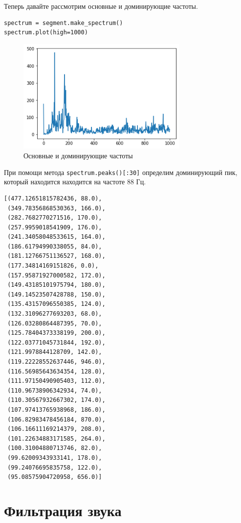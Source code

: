 \documentclass[a4paper,12pt]{report}
\begin{document}
Теперь давайте рассмотрим основные и доминирующие частоты.

\begin{lstlisting}[caption=Основные и доминирующие частоты]
spectrum = segment.make_spectrum()
spectrum.plot(high=1000)
\end{lstlisting}

\begin{figure}[H]
        \centering
        \includegraphics[width=0.75\textwidth]{lab1_fig2_4.png}
        \caption{Основные и доминирующие частоты}
        \label{fig:lab1_fig2_4}
\end{figure}

При помощи метода \texttt{spectrum.peaks()[:30]} определим доминирующий пик, который находится находится на частоте 88 Гц.

\begin{lstlisting}[caption=Отфильтрованный массив пиков]
[(477.12651815782436, 88.0),
 (349.78356868530363, 166.0),
 (282.7682770271516, 170.0),
 (257.9959018541909, 176.0),
 (241.34058048533615, 164.0),
 (186.61794990338055, 84.0),
 (181.12766751136527, 168.0),
 (177.34814169151826, 0.0),
 (157.95871927000582, 172.0),
 (149.43185101975794, 180.0),
 (149.14523507428788, 150.0),
 (135.43157096550385, 124.0),
 (132.31096277693203, 68.0),
 (126.03280864487395, 70.0),
 (125.78404373338199, 200.0),
 (122.03771045731844, 192.0),
 (121.9978844128709, 142.0),
 (119.22228552637446, 946.0),
 (116.56985643634354, 128.0),
 (111.97150490905403, 112.0),
 (110.96738906342934, 74.0),
 (110.30567932667302, 174.0),
 (107.97413765938968, 186.0),
 (106.82983478456184, 870.0),
 (106.16611169214379, 208.0),
 (101.22634883171585, 264.0),
 (100.31004880713746, 82.0),
 (99.62009343933141, 178.0),
 (99.24076695835758, 122.0),
 (95.08575904720958, 656.0)]
\end{lstlisting}

\section{Фильтрация звука}
\end{document}
